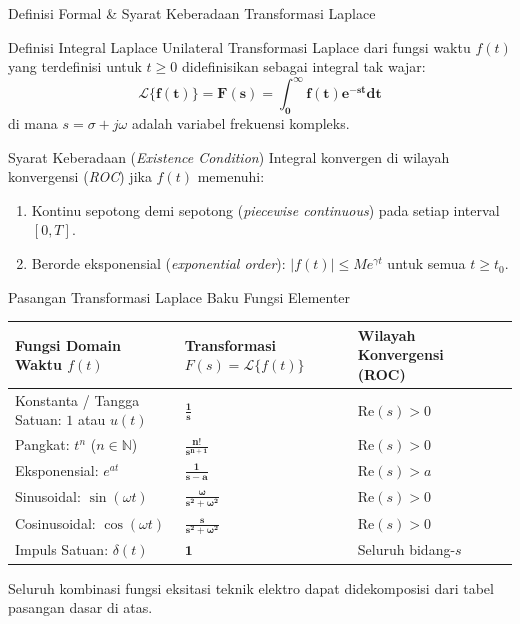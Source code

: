 \documentclass[aspectratio=169,10pt]{beamer}
\begin{document}
\begin{frame}{Definisi Formal \& Syarat Keberadaan Transformasi Laplace}
  \begin{block}{Definisi Integral Laplace Unilateral}
    Transformasi Laplace dari fungsi waktu $f(t)$ yang terdefinisi untuk $t \ge 0$ didefinisikan sebagai integral tak wajar:
    \begin{equation}
      \mathbf{\mathcal{L}\{f(t)\} = F(s) = \int_0^\infty f(t) e^{-st} dt}
    \end{equation}
    di mana $s = \sigma + j\omega$ adalah variabel frekuensi kompleks.
  \end{block}
  \vspace{0.15cm}
  \begin{alertblock}{Syarat Keberadaan (\textit{Existence Condition})}
    Integral konvergen di wilayah konvergensi (\textit{ROC}) jika $f(t)$ memenuhi:
    \begin{enumerate}
      \item Kontinu sepotong demi sepotong (\textit{piecewise continuous}) pada setiap interval $[0, T]$.
      \item Berorde eksponensial (\textit{exponential order}): $|f(t)| \le M e^{\gamma t}$ untuk semua $t \ge t_0$.
    \end{enumerate}
  \end{alertblock}
\end{frame}

\begin{frame}{Pasangan Transformasi Laplace Baku Fungsi Elementer}
  \begin{center}
    \small
    \begin{tabular}{lllc}
      \toprule
      \textbf{Fungsi Domain Waktu $f(t)$} & \textbf{Transformasi $F(s) = \mathcal{L}\{f(t)\}$} & \textbf{Wilayah Konvergensi (ROC)} \\ \midrule
      Konstanta / Tangga Satuan: $1$ atau $u(t)$ & $\mathbf{\frac{1}{s}}$ & $\text{Re}(s) > 0$ \\
      Pangkat: $t^n$ ($n \in \mathbb{N}$) & $\mathbf{\frac{n!}{s^{n+1}}}$ & $\text{Re}(s) > 0$ \\
      Eksponensial: $e^{at}$ & $\mathbf{\frac{1}{s - a}}$ & $\text{Re}(s) > a$ \\
      Sinusoidal: $\sin(\omega t)$ & $\mathbf{\frac{\omega}{s^2 + \omega^2}}$ & $\text{Re}(s) > 0$ \\
      Cosinusoidal: $\cos(\omega t)$ & $\mathbf{\frac{s}{s^2 + \omega^2}}$ & $\text{Re}(s) > 0$ \\
      Impuls Satuan: $\delta(t)$ & $\mathbf{1}$ & Seluruh bidang-$s$ \\ \bottomrule
    \end{tabular}
  \end{center}
  \vspace{0.15cm}
  \footnotesize Seluruh kombinasi fungsi eksitasi teknik elektro dapat didekomposisi dari tabel pasangan dasar di atas.
\end{frame}
\end{document}
